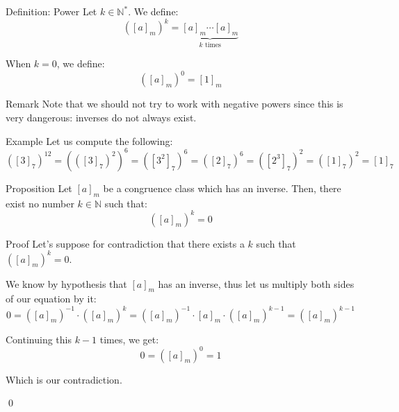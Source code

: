 \documentclass[a4paper]{article}
\begin{document}
\begin{parag}{Definition: Power}
    Let $k \in \mathbb{N}^*$. We define: 
    \[\left(\left[a\right]_m\right)^k = \underbrace{\left[a\right]_m \cdots \left[a\right]_m}_{\text{$k$ times}}\]
    
    When $k = 0$, we define: 
    \[\left(\left[a\right]_m\right)^{0} = \left[1\right]_m\]
    
    \begin{subparag}{Remark}
        Note that we should not try to work with negative powers since this is very dangerous: inverses do not always exist.
    \end{subparag}

    \begin{subparag}{Example}
        Let us compute the following: 
        \[\left(\left[3\right]_7\right)^{12} = \left(\left(\left[3\right]_7\right)^{2}\right)^{6} = \left(\left[3^2\right]_7\right)^6 = \left(\left[2\right]_7\right)^{6} = \left(\left[2^3\right]_7\right)^2 = \left(\left[1\right]_7\right)^2 = \left[1\right]_7\]
    \end{subparag}
\end{parag}

\begin{parag}{Proposition}
    Let $\left[a\right]_m$ be a congruence class which has an inverse. Then, there exist no number $k \in \mathbb{N}$ such that: 
    \[\left(\left[a\right]_m\right)^k = 0\]

    \begin{subparag}{Proof}
        Let's suppose for contradiction that there exists a $k$ such that $\left(\left[a\right]_m\right)^k = 0$.

        We know by hypothesis that $\left[a\right]_m$ has an inverse, thus let us multiply both sides of our equation by it: 
        \[0 = \left(\left[a\right]_m\right)^{-1} \cdot \left(\left[a\right]_m\right)^{k} = \left(\left[a\right]_m\right)^{-1} \cdot \left[a\right]_m \cdot \left(\left[a\right]_m\right)^{k-1} = \left(\left[a\right]_m\right)^{k-1}\]
        
        Continuing this $k-1$ times, we get: 
        \[0 = \left(\left[a\right]_m\right)^{0} = 1\]
        
        Which is our contradiction.

        \qed
    \end{subparag}
    
\end{parag}
\end{document}
